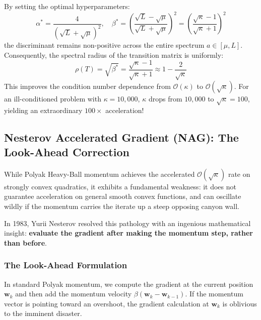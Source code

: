 By setting the optimal hyperparameters:
\begin{equation}
\alpha^* = \frac{4}{(\sqrt{L} + \sqrt{\mu})^2}, \quad \beta^* = \left( \frac{\sqrt{L} - \sqrt{\mu}}{\sqrt{L} + \sqrt{\mu}} \right)^2 = \left( \frac{\sqrt{\kappa} - 1}{\sqrt{\kappa} + 1} \right)^2
\label{eq:optimal_momentum}
\end{equation}
the discriminant remains non-positive across the entire spectrum $a \in [\mu, L]$. Consequently, the spectral radius of the transition matrix is uniformly:
\begin{equation}
\rho(T) = \sqrt{\beta^*} = \frac{\sqrt{\kappa} - 1}{\sqrt{\kappa} + 1} \approx 1 - \frac{2}{\sqrt{\kappa}}
\end{equation}
This improves the condition number dependence from $\mathcal{O}(\kappa)$ to $\mathcal{O}(\sqrt{\kappa})$. For an ill-conditioned problem with $\kappa = 10{,}000$, $\kappa$ drops from $10{,}000$ to $\sqrt{\kappa} = 100$, yielding an extraordinary $100\times$ acceleration!

\subsection{Nesterov Accelerated Gradient (NAG): The Look-Ahead Correction}
While Polyak Heavy-Ball momentum achieves the accelerated $\mathcal{O}(\sqrt{\kappa})$ rate on strongly convex quadratics, it exhibits a fundamental weakness: it does not guarantee acceleration on general smooth convex functions, and can oscillate wildly if the momentum carries the iterate up a steep opposing canyon wall.

In 1983, Yurii Nesterov resolved this pathology with an ingenious mathematical insight: \textbf{evaluate the gradient after making the momentum step, rather than before}.

\subsubsection{The Look-Ahead Formulation}
In standard Polyak momentum, we compute the gradient at the current position $\mathbf{w}_k$ and then add the momentum velocity $\beta(\mathbf{w}_k - \mathbf{w}_{k-1})$. If the momentum vector is pointing toward an overshoot, the gradient calculation at $\mathbf{w}_k$ is oblivious to the imminent disaster.

